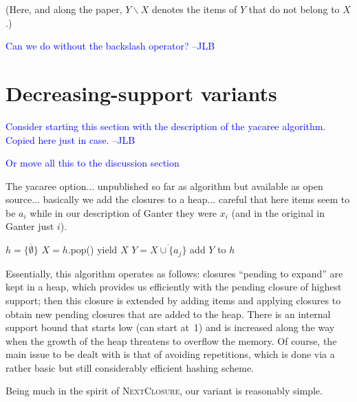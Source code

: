 \documentclass{article}
\newcommand{\added}[1]{\textcolor{blue}{#1}}
\begin{document}
(Here, and along the paper, 
$Y\backslash X$ denotes the items of $Y$ 
that do not belong to $X$.)

\added{Can we do without the backslash operator? --JLB} 

\section{Decreasing-support variants}\label{sec:Main}

\added{Consider starting this section with the description 
of the yacaree algorithm. Copied here just in case. --JLB}

\added{Or move all this to the discussion section} 

The yacaree option... unpublished so far as algorithm but 
available as open source... basically we add the closures to a heap...
careful that here items seem to be $a_i$ while 
in our description of Ganter they were $x_i$
(and in the original in Ganter just $i$).


\begin{algorithm}
\caption{{\sc Yacaree}} %
  \begin{algorithmic}[1]
    \STATE $h = \{\overline{\emptyset}\}$ 
    	\STATE $X = h$.pop() 
        \STATE yield $X$
    		\STATE $Y=\overline{X \cup \{a_j\}}$
    		  	\STATE add $Y$ to $h$
        	\ENDIF
      \ENDFOR

    \ENDWHILE
  \end{algorithmic}
\end{algorithm}

Essentially, this algorithm  operates as follows: 
closures ``pending to expand'' are kept in a heap, 
which provides us efficiently with the pending closure of highest 
support; then this closure is extended by adding items and applying
closures to obtain new pending closures that are added to the heap.
There is an internal support bound that starts low (can start at~1)
and is increased along the way when the growth of the heap threatens
to overflow the memory. Of course, the main issue to be dealt with
is that of avoiding repetitions, which is done via a rather basic
but still considerably efficient hashing scheme. 

Being much in the spirit of \textsc{NextClosure}, our variant
is reasonably simple. 
\end{document}
